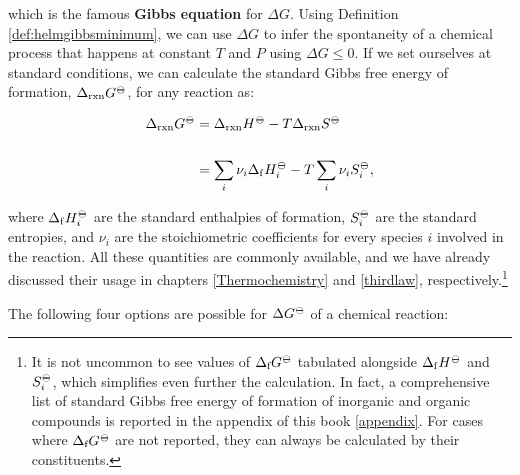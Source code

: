 \documentclass[
  9pt,
]{extbook}
\theoremstyle{definition}
\theoremstyle{definition}
\theoremstyle{definition}
\theoremstyle{remark}
\begin{document}
which is the famous \textbf{Gibbs equation} for \(\Delta G\). Using Definition \ref{def:helmgibbsminimum}, we can use \(\Delta G\) to infer the spontaneity of a chemical process that happens at constant \(T\) and \(P\) using \(\Delta G \leq 0\). If we set ourselves at standard conditions, we can calculate the standard Gibbs free energy of formation, \(\Delta_{\text{rxn}} G^{-\kern-6pt{\ominus}\kern-6pt-}\), for any reaction as:

\begin{equation}
\begin{aligned}
\Delta_{\text{rxn}} G^{-\kern-6pt{\ominus}\kern-6pt-}&= \Delta_{\text{rxn}} H^{-\kern-6pt{\ominus}\kern-6pt-}-T \Delta_{\text{rxn}} S^{-\kern-6pt{\ominus}\kern-6pt-}\\
\\
&= \sum_i \nu_i \Delta_{\mathrm{f}} H_i^{-\kern-6pt{\ominus}\kern-6pt-}- T \sum_i \nu_i S_i^{-\kern-6pt{\ominus}\kern-6pt-},
\end{aligned}
\label{eq:gibbseq2}
\end{equation}

where \(\Delta_{\mathrm{f}} H_i^{-\kern-6pt{\ominus}\kern-6pt-}\) are the standard enthalpies of formation, \(S_i^{-\kern-6pt{\ominus}\kern-6pt-}\) are the standard entropies, and \(\nu_i\) are the stoichiometric coefficients for every species \(i\) involved in the reaction. All these quantities are commonly available, and we have already discussed their usage in chapters \ref{Thermochemistry} and \ref{thirdlaw}, respectively.\footnote{It is not uncommon to see values of \(\Delta_{\text{f}} G^{-\kern-6pt{\ominus}\kern-6pt-}\) tabulated alongside \(\Delta_{\mathrm{f}} H^{-\kern-6pt{\ominus}\kern-6pt-}\) and \(S_i^{-\kern-6pt{\ominus}\kern-6pt-}\), which simplifies even further the calculation. In fact, a comprehensive list of standard Gibbs free energy of formation of inorganic and organic compounds is reported in the appendix of this book \ref{appendix}. For cases where \(\Delta_{\text{f}} G^{-\kern-6pt{\ominus}\kern-6pt-}\) are not reported, they can always be calculated by their constituents.}

The following four options are possible for \(\Delta G^{-\kern-6pt{\ominus}\kern-6pt-}\) of a chemical reaction:
\end{document}
